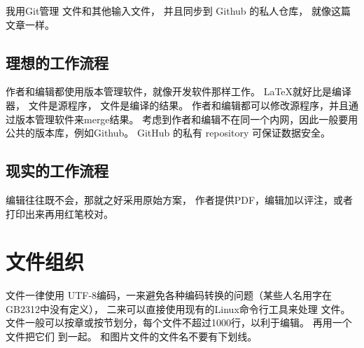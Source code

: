 我用Git管理  文件和其他输入文件，
并且同步到 Github 的私人仓库，
就像这篇文章一样。

\subsection{理想的工作流程}
作者和编辑都使用版本管理软件，就像开发软件那样工作。
\LaTeX 就好比是编译器，
 文件是源程序，
 文件是编译的结果。
作者和编辑都可以修改源程序，并且通过版本管理软件来merge结果。
考虑到作者和编辑不在同一个内网，因此一般要用公共的版本库，例如Github。
GitHub 的私有 repository 可保证数据安全。

\subsection{现实的工作流程}
编辑往往既不会，那就之好采用原始方案，
作者提供PDF，编辑加以评注，或者打印出来再用红笔校对。

\section{ 文件组织}
 文件一律使用 UTF-8编码，一来避免各种编码转换的问题（某些人名用字在GB2312中没有定义），
二来可以直接使用现有的Linux命令行工具来处理  文件。
 文件一般可以按章或按节划分，每个文件不超过1000行，以利于编辑。
再用一个  文件把它们  到一起。
 和图片文件的文件名不要有下划线。
